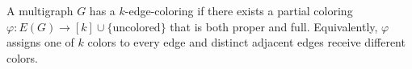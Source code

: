 \begin{definition}
A multigraph $G$ has a $k$-edge-coloring if there exists a partial coloring
$\varphi:E(G)\to [k]\cup\{\text{uncolored}\}$ that is both proper and full.
Equivalently, $\varphi$ assigns one of $k$ colors to every edge and distinct
adjacent edges receive different colors.
\end{definition}
